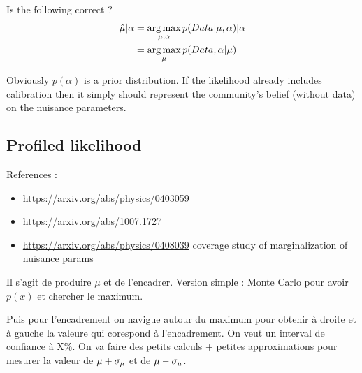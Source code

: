 
Is the following correct ?
\begin{align}
	\hat\mu | \alpha &= \operatorname*{arg\,max}_{\mu, \alpha} p(Data | \mu, \alpha) | \alpha \\
		&= \operatorname*{arg\,max}_{\mu} p(Data , \alpha | \mu)
\end{align}

Obviously $p(\alpha)$ is a prior distribution.
If the likelihood already includes calibration then it simply should represent the community's belief (without data) on the nuisance parameters.





\subsection{Profiled likelihood} %
\label{sub:profiled_likelihood}




References : 
\begin{itemize}
	\item \url{https://arxiv.org/abs/physics/0403059}
	\item \url{https://arxiv.org/abs/1007.1727}
	\item \url{https://arxiv.org/abs/physics/0408039} coverage study of marginalization of nuisance params
\end{itemize}


Il s'agit de produire $\mu$ et de l'encadrer.
Version simple : Monte Carlo pour avoir $p(x)$ et chercher le maximum.

Puis pour l'encadrement on navigue autour du maximum pour obtenir à droite et à gauche la valeure qui corespond à l'encadrement.
On veut un interval de confiance à X\%.
On va faire des petits calculs + petites approximations pour mesurer la valeur de $\mu + \sigma_\mu$ et de $\mu - \sigma_\mu$.


